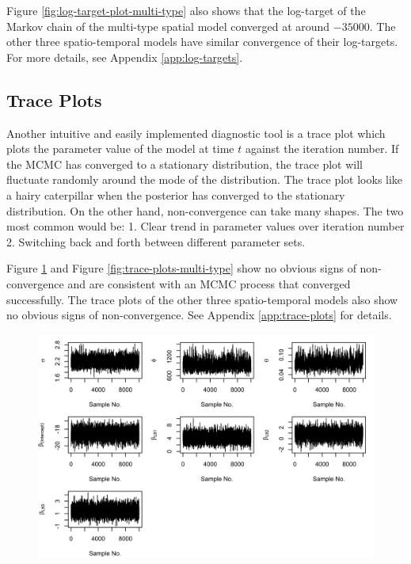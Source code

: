 Figure \ref{fig:log-target-plot-multi-type} also shows that the log-target of the Markov chain of the multi-type spatial model converged at around $-35000$. The other three spatio-temporal models have similar convergence of their log-targets. For more details, see Appendix \ref{app:log-targets}.

\subsection{Trace Plots}

Another intuitive and easily implemented diagnostic tool is a trace plot
which plots the parameter value of the model at time $t$ against the iteration
number. If the MCMC has converged to a stationary distribution, the trace plot will fluctuate randomly around the mode of the distribution. The trace plot looks like a hairy caterpillar when the posterior has converged to the stationary distribution. On the other hand, non-convergence can take many shapes. The two most common would be: 1. Clear trend in parameter values over iteration number 2. Switching back and forth between different parameter sets.

Figure \ref{fig:trace-plots-all-cases} and Figure \ref{fig:trace-plots-multi-type} show no obvious signs of non-convergence and are consistent with an MCMC process that converged successfully. The trace plots of the other three spatio-temporal models also show no obvious signs of non-convergence. See Appendix \ref{app:trace-plots} for details.

\begin{figure}[H]
    \begin{center}
        \includegraphics[scale=1]{Traceplots for Beta and Eta - All Cases.png}
    \end{center}
     \label{fig:trace-plots-all-cases}
\end{figure}

